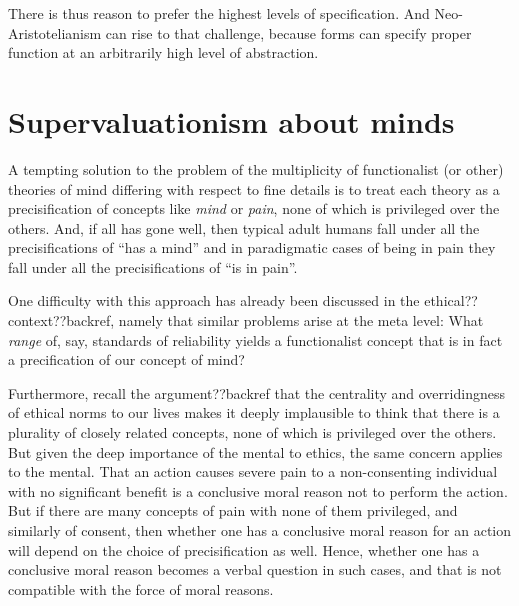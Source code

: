 There is thus reason to prefer the highest levels of specification. And Neo-Aristotelianism can rise to that challenge, because 
forms can specify proper function at an arbitrarily high level of abstraction. 

\section{Supervaluationism about minds}
A tempting solution to the problem of the multiplicity of functionalist (or other) theories of mind differing with respect
to fine details is to treat each theory as a precisification of concepts like \textit{mind} or \textit{pain}, none of which
is privileged over the others. And,
if all has gone well, then typical adult humans fall under all the precisifications of ``has a mind'' and in paradigmatic
cases of being in pain they fall under all the precisifications of ``is in pain''. 

One difficulty with this approach has already been discussed in the ethical?? context??backref, namely that similar problems
arise at the meta level: What \textit{range} of, say, standards of reliability yields a functionalist concept that is in fact a 
precification of our concept of mind? 

Furthermore, recall the argument??backref that the centrality and overridingness of ethical norms to our lives makes it 
deeply implausible to think that there is a plurality of closely related concepts, none of which is privileged over the others.
But given the deep importance of the mental to ethics, the same concern applies to the mental. That an action causes severe
pain to a non-consenting individual with no significant benefit is a conclusive moral reason not to perform the action. 
But if there are many concepts of pain with none of them privileged, and similarly of consent, then whether one has a
conclusive moral reason for an action will depend on the choice of precisification as well. Hence, whether one has a 
conclusive moral reason becomes a verbal question in such cases, and that is not compatible with the force of moral
reasons.

